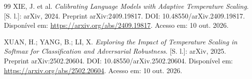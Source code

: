 \documentclass[12pt,openany,oneside,a4paper,brazil,chapter=TITLE]{abntex2}
\begin{document}
\begin{SingleSpacing}
\begin{thebibliography}{99}
 XIE, J. et al. \textit{Calibrating Language Models with Adaptive Temperature Scaling}. [S. l.]: arXiv, 2024. Preprint arXiv:2409.19817. DOI: 10.48550/arXiv.2409.19817. Disponível em: \url{https://arxiv.org/abs/2409.19817}. Acesso em: 10 out. 2026.

 XUAN, H.; YANG, B.; LI, X. \textit{Exploring the Impact of Temperature Scaling in Softmax for Classification and Adversarial Robustness}. [S. l.]: arXiv, 2025. Preprint arXiv:2502.20604. DOI: 10.48550/arXiv.2502.20604. Disponível em: \url{https://arxiv.org/abs/2502.20604}. Acesso em: 10 out. 2026.

\end{thebibliography}


\end{SingleSpacing}

\end{document}
